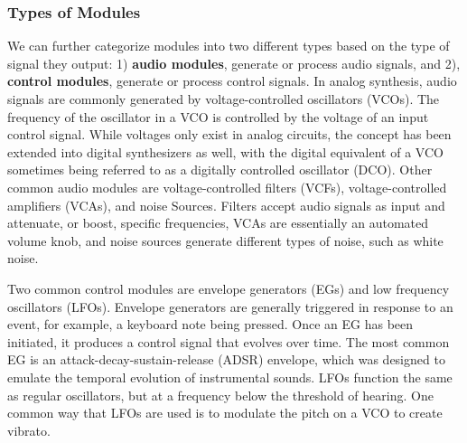 \subsubsection{Types of Modules}
We can further categorize modules into two different types based on the type of signal they output: 1) \textbf{audio modules}, generate or process audio signals, and 2), \textbf{control modules}, generate or process control signals. In analog synthesis, audio signals are commonly generated by voltage-controlled oscillators (VCOs). The frequency of the oscillator in a VCO is controlled by the voltage of an input control signal. While voltages only exist in analog circuits, the concept has been extended into digital synthesizers as well, with the digital equivalent of a VCO sometimes being referred to as a digitally controlled oscillator (DCO). Other common audio modules are voltage-controlled filters (VCFs), voltage-controlled amplifiers (VCAs), and noise Sources. Filters accept audio signals as input and attenuate, or boost, specific frequencies, VCAs are essentially an automated volume knob, and noise sources generate different types of noise, such as white noise.

Two common control modules are envelope generators (EGs) and low frequency oscillators (LFOs). Envelope generators are generally triggered in response to an event, for example,  a keyboard note being pressed. Once an EG has been initiated, it produces a control signal that evolves over time. The most common EG is an attack-decay-sustain-release (ADSR) envelope, which was designed to emulate the temporal evolution of instrumental sounds.  %
LFOs function the same as regular oscillators, but at a frequency below the threshold of hearing. One common way that LFOs are used is to modulate the pitch on a VCO to create vibrato.

